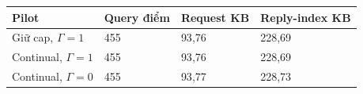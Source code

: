 \par\smallskip\noindent\begin{tabularx}{\linewidth}{@{}P{4cm}XXX@{}}\toprule
\textbf{Pilot} & \textbf{Query điểm} & \textbf{Request KB} & \textbf{Reply-index KB} \\
\midrule
Giữ cap, $\Gamma=1$ & 455 & 93{,}76 & 228{,}69 \\
Continual, $\Gamma=1$ & 455 & 93{,}76 & 228{,}69 \\
Continual, $\Gamma=0$ & 455 & 93{,}77 & 228{,}73 \\
\bottomrule\end{tabularx}\par\smallskip
